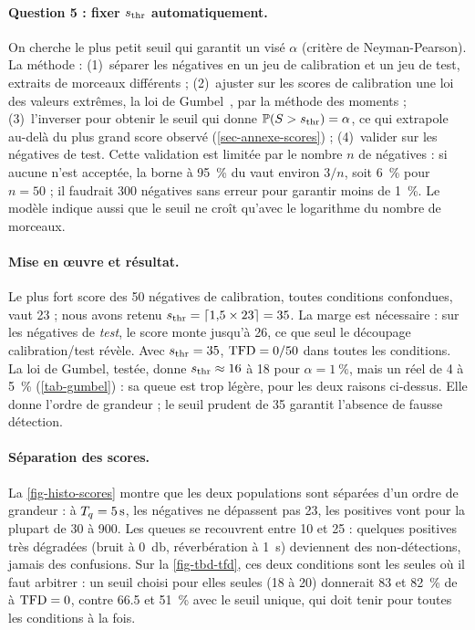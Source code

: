 \paragraph{Question 5 : fixer $s_{\mathrm{thr}}$ automatiquement.} On cherche le plus petit seuil qui
garantit un \TFD{} visé $\alpha$ (critère de Neyman-Pearson). La méthode :
(1)~séparer les négatives en un jeu de calibration et un jeu de test, extraits de morceaux
différents ; (2)~ajuster sur les scores de calibration une loi des valeurs extrêmes, la loi
de Gumbel~\cite{gumbel1958}, par la méthode des moments ; (3)~l'inverser pour obtenir le
seuil qui donne $\mathbb{P}(S > s_{\mathrm{thr}}) = \alpha$, ce qui extrapole au-delà du plus grand score
observé (\cref{sec-annexe-scores}) ; (4)~valider sur les négatives de test. Cette validation
est limitée par le nombre $n$ de négatives : si aucune n'est acceptée, la borne à
\qty{95}{\percent} du \TFD{} vaut environ $3/n$, soit \qty{6}{\percent} pour $n = 50$ ; il
faudrait 300 négatives sans erreur pour garantir moins de \qty{1}{\percent}. Le modèle indique
aussi que le seuil ne croît qu'avec le logarithme du nombre de morceaux.

\paragraph{Mise en œuvre et résultat.} Le plus fort score des 50 négatives de calibration,
toutes conditions confondues, vaut 23 ; nous avons retenu
$s_{\mathrm{thr}} = \lceil \num{1.5} \times 23 \rceil = 35$. La marge est nécessaire : sur les négatives de
\emph{test}, le score monte jusqu'à 26, ce que seul le découpage calibration/test révèle. Avec
$s_{\mathrm{thr}} = 35$, $\mathrm{TFD} = 0/50$ dans toutes les conditions. La loi de Gumbel, testée, donne
$s_{\mathrm{thr}} \approx 16$ à 18 pour $\alpha = \qty{1}{\percent}$, mais un \TFD{} réel de 4 à
\qty{5}{\percent} (\cref{tab-gumbel}) : sa queue est trop légère, pour les deux raisons
ci-dessus. Elle donne l'ordre de grandeur ; le seuil prudent de 35 garantit l'absence de
fausse détection.

\paragraph{Séparation des scores.} La \cref{fig-histo-scores} montre que les deux
populations sont séparées d'un ordre de grandeur : à $T_q = \qty{5}{\second}$, les négatives
ne dépassent pas 23, les positives vont pour la plupart de 30 à 900. Les queues se
recouvrent entre 10 et 25 : quelques positives très dégradées (bruit à \qty{0}{\decibel},
réverbération à \qty{1}{\second}) deviennent des non-détections, jamais des confusions. Sur
la \cref{fig-tbd-tfd}, ces deux conditions sont les seules où il faut arbitrer : un seuil
choisi pour elles seules (18 à 20) donnerait 83 et \qty{82}{\percent} de \TBD{} à $\mathrm{TFD} = 0$,
contre \num{66.5} et \qty{51}{\percent} avec le seuil unique, qui doit tenir pour toutes les
conditions à la fois.

